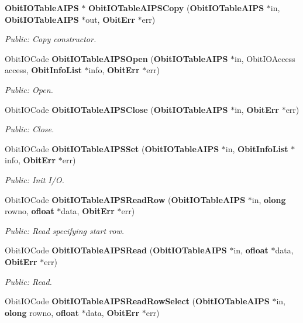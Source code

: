 \begin{CompactItemize}
{\bf Obit\-IOTable\-AIPS} $\ast$ {\bf Obit\-IOTable\-AIPSCopy} ({\bf Obit\-IOTable\-AIPS} $\ast$in, {\bf Obit\-IOTable\-AIPS} $\ast$out, {\bf Obit\-Err} $\ast$err)
\begin{CompactList}\small\item\em Public: Copy constructor. \item\end{CompactList}\item 
Obit\-IOCode {\bf Obit\-IOTable\-AIPSOpen} ({\bf Obit\-IOTable\-AIPS} $\ast$in, Obit\-IOAccess access, {\bf Obit\-Info\-List} $\ast$info, {\bf Obit\-Err} $\ast$err)
\begin{CompactList}\small\item\em Public: Open. \item\end{CompactList}\item 
Obit\-IOCode {\bf Obit\-IOTable\-AIPSClose} ({\bf Obit\-IOTable\-AIPS} $\ast$in, {\bf Obit\-Err} $\ast$err)
\begin{CompactList}\small\item\em Public: Close. \item\end{CompactList}\item 
Obit\-IOCode {\bf Obit\-IOTable\-AIPSSet} ({\bf Obit\-IOTable\-AIPS} $\ast$in, {\bf Obit\-Info\-List} $\ast$info, {\bf Obit\-Err} $\ast$err)
\begin{CompactList}\small\item\em Public: Init I/O. \item\end{CompactList}\item 
Obit\-IOCode {\bf Obit\-IOTable\-AIPSRead\-Row} ({\bf Obit\-IOTable\-AIPS} $\ast$in, {\bf olong} rowno, {\bf ofloat} $\ast$data, {\bf Obit\-Err} $\ast$err)
\begin{CompactList}\small\item\em Public: Read specifying start row. \item\end{CompactList}\item 
Obit\-IOCode {\bf Obit\-IOTable\-AIPSRead} ({\bf Obit\-IOTable\-AIPS} $\ast$in, {\bf ofloat} $\ast$data, {\bf Obit\-Err} $\ast$err)
\begin{CompactList}\small\item\em Public: Read. \item\end{CompactList}\item 
Obit\-IOCode {\bf Obit\-IOTable\-AIPSRead\-Row\-Select} ({\bf Obit\-IOTable\-AIPS} $\ast$in, {\bf olong} rowno, {\bf ofloat} $\ast$data, {\bf Obit\-Err} $\ast$err)

\end{CompactItemize}
